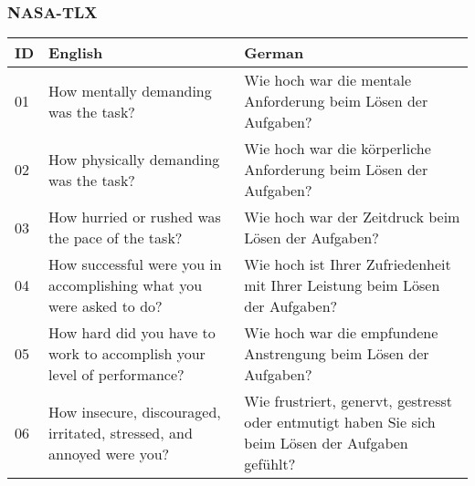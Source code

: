 \endgroup

\clearpage
\subsubsection*{NASA-TLX}

\begingroup
\setlength{\tabcolsep}{12pt}
\renewcommand{\arraystretch}{1.5}

\begin{table}[ht]
\begin{tabularx}{\textwidth}{l|X|X}
    \textbf{ID} & \textbf{English} & \textbf{German} \\
    \hline
    01 & How mentally demanding was the task? & Wie hoch war die mentale Anforderung beim Lösen der Aufgaben? \\
    02 & How physically demanding was the task? & Wie hoch war die körperliche Anforderung beim Lösen der Aufgaben? \\
    03 & How hurried or rushed was the pace of the task? & Wie hoch war der Zeitdruck beim Lösen der Aufgaben? \\
    04 & How successful were you in accomplishing what you were asked to do? & Wie hoch ist Ihrer Zufriedenheit mit Ihrer Leistung beim Lösen der Aufgaben? \\
    05 & How hard did you have to work to accomplish your level of performance? & Wie hoch war die empfundene Anstrengung beim Lösen der Aufgaben? \\
    06 & How insecure, discouraged, irritated, stressed, and annoyed were you? & Wie frustriert, genervt, gestresst oder entmutigt haben Sie sich beim Lösen der Aufgaben gefühlt? \\
\end{tabularx}
\end{table}

\endgroup

